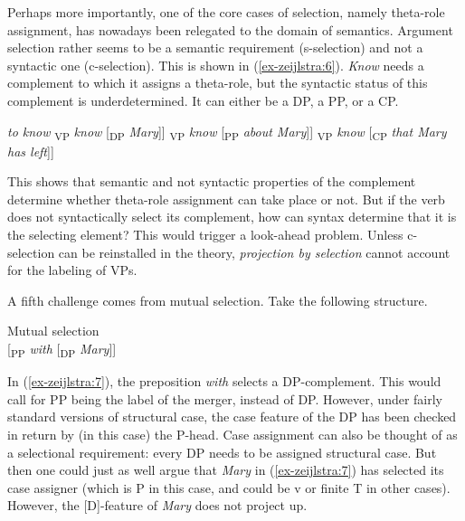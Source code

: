 \documentclass[output=paper
,modfonts
,nonflat]{langsci/langscibook}
\begin{document}
Perhaps more importantly, one of the core cases of selection, namely theta-role assignment, has nowadays been relegated to the domain of semantics. Argument selection rather seems to be a semantic requirement (s-selection) and not a syntactic one (c-selection). This is shown in (\ref{ex-zeijlstra:6}). \textit{Know} needs a complement to which it assigns a theta-role, but the syntactic status of this complement is underdetermined. It can either be a DP, a PP, or a CP. 

\begin{exe}
\ex \textit{to know}\label{ex-zeijlstra:6}
	\xlist
	\ex {[}\textsubscript{VP} \textit{know} {[}\textsubscript{DP}
		\textit{Mary}{]}{]}
	\ex {[}\textsubscript{VP} \textit{know} {[}\textsubscript{PP} 	
		\textit{about Mary}{]}{]}
	\ex {[}\textsubscript{VP} \textit{know} {[}\textsubscript{CP} 		
		\textit{that Mary has left}{]}{]}
	\endxlist
\end{exe}
This shows that semantic and not syntactic properties of the complement determine whether theta-role assignment can take place or not. But if the verb does not syntactically select its complement, how can syntax determine that it is the selecting element? This would trigger a look-ahead problem. Unless c-selection can be reinstalled in the theory, \textit{projection by selection} cannot account for the labeling of VPs. 

A fifth challenge comes from mutual selection. Take the following structure.

\begin{exe}
\ex Mutual selection \label{ex-zeijlstra:7} \\
	{[}\textsubscript{PP} \textit{with} {[}\textsubscript{DP} \textit{Mary}{]}{]}
\end{exe}
In (\ref{ex-zeijlstra:7}), the preposition \textit{with} selects a DP-complement. This would call for PP being the label of the merger, instead of DP. However, under fairly standard versions of structural case, the case feature of the DP has been checked in return by (in this case) the P-head. Case assignment can also be thought of as a selectional requirement: every DP needs to be assigned structural case. But then one could just as well argue that \textit{Mary} in (\ref{ex-zeijlstra:7}) has selected its case assigner (which is P in this case, and could be v or finite T in other cases). However, the {[}D{]}-feature of \textit{Mary} does not project up.
\end{document}
